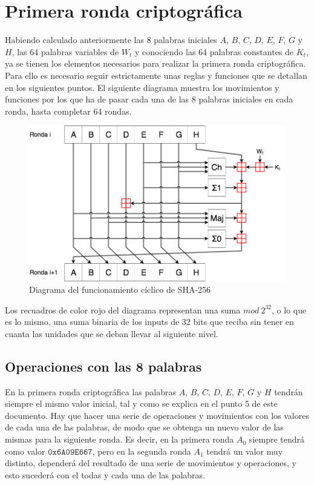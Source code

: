 \documentclass{article}
\begin{document}
\section{Primera ronda criptográfica}
    Habiendo calculado anteriormente las 8 palabras iniciales $A$, $B$, $C$, $D$, $E$, $F$, $G$ y $H$, las 64 palabras variables de $W_{t}$ y conociendo las 64 palabras constantes de $K_{t}$, ya se tienen los elementos necesarios para realizar la primera ronda criptográfica. Para ello es necesario seguir estrictamente unas reglas y funciones que se detallan en los siguientes puntos. El siguiente diagrama muestra los movimientos y funciones por los que ha de pasar cada una de las 8 palabras iniciales en cada ronda, hasta completar 64 rondas.
        \begin{figure}[H]
        \centering
            \includegraphics[scale=0.33]{img/SHA-256-diagram.png}
            \caption{Diagrama del funcionamiento cíclico de SHA-256}
        \end{figure}
    
    Los recuadros de color rojo del diagrama representan una suma $mod \ 2^{32}$, o lo que es lo mismo, una suma binaria de los inputs de 32 bits que reciba sin tener en cuanta las unidades que se deban llevar al siguiente nivel.
    
    \subsection{Operaciones con las 8 palabras}
        En la primera ronda criptográfica las palabras $A$, $B$, $C$, $D$, $E$, $F$, $G$ y $H$ tendrán siempre el mismo valor inicial, tal y como se explica en el punto 5 de este documento. Hay que hacer una serie de operaciones y movimientos con los valores de cada una de las palabras, de modo que se obtenga un nuevo valor de las mismas para la siguiente ronda. Es decir, en la primera ronda $A_{0}$ siempre tendrá como valor $\texttt{0x6A09E667}$, pero en la segunda ronda $A_{1}$ tendrá un valor muy distinto, dependerá del resultado de una serie de movimientos y operaciones, y esto sucederá con el todas y cada una de las palabras.
        
\end{document}
